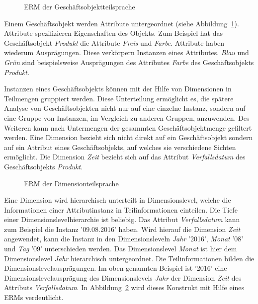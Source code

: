 \documentclass[
  language=german, %
  type=bachelor,%
  ngerman
]{isthesis}
\begin{document}
\begin{content}
  \begin{figure}
    \resizebox{200px}{!}{}
    \caption{\acrshort{ERM} der Geschäftsobjektteilsprache}\label{geschaeftsobjekt}
  \end{figure}

  Einem Geschäftsobjekt werden Attribute untergeordnet (siehe
  Abbildung~\ref{geschaeftsobjekt}). Attribute spezifizieren Eigenschaften des
  Objekts. Zum Beispiel hat das Geschäftsobjekt \textit{Produkt} die Attribute
  \textit{Preis} und \textit{Farbe}. Attribute haben wiederum Ausprägungen.
  Diese verkörpern Instanzen eines Attributes. \textit{Blau} und \textit{Grün}
  sind beispielsweise Ausprägungen des Attributes \textit{Farbe} des
  Geschäftsobjekts \textit{Produkt}.

	Instanzen eines Geschäftsobjekts können mit der Hilfe von Dimensionen in
	Teilmengen gruppiert werden. Diese Unterteilung ermöglicht es, die spätere
	Analyse von Geschäftsobjekten nicht nur auf eine einzelne Instanz, sondern
	auf eine Gruppe von Instanzen, \ggf{} im Vergleich zu anderen Gruppen,
	anzuwenden. Des Weiteren kann nach Untermengen der gesammten
	Geschäftsobjektmenge gefiltert werden.  Eine Dimension bezieht sich nicht
	direkt auf ein Geschäftsobjekt sondern auf ein Attribut eines
	Geschäftsobjekts, auf welches sie verschiedene Sichten ermöglicht. Die
	Dimension \textit{Zeit} bezieht sich \zB{} auf das Attribut
	\textit{Verfallsdatum} des Geschäftsobjekts \textit{Produkt}. 

  \begin{figure}
    \resizebox{350px}{!}{}
    \caption{\acrshort{ERM} der Dimensionteilsprache}\label{dimension-erm}
  \end{figure}

	Eine Dimension wird hierarchisch unterteilt in Dimensionslevel, welche die
	Informationen einer Attributinstanz in Teilinformationen einteilen. Die Tiefe
	einer Dimensionslevelhierarchie ist beliebig. Das Attribut
	\textit{Verfallsdatum} kann zum Beispiel die Instanz '09.08.2016' haben. Wird
	hierauf die Dimension \textit{Zeit} angewendet, kann die Instanz in den
	Dimensionsleveln \textit{Jahr} '2016', \textit{Monat} '08' und \textit{Tag}
	'09' unterschieden werden. Das Dimensionslevel \textit{Monat} ist hier dem
	Dimensionslevel \textit{Jahr} hierarchisch untergeordnet. Die
	Teilinformationen bilden die Dimensionslevelausprägungen. Im oben genannten
	Beispiel ist '2016' eine Dimensionslevelausprägung des Dimensionslevels
	\textit{Jahr} der Dimension \textit{Zeit} des Attributs
	\textit{Verfallsdatum}. In Abbildung~\ref{dimension-erm} wird dieses
	Konstrukt mit Hilfe eines \acrshort{ERM}s verdeutlicht.


\end{content}
\end{document}
